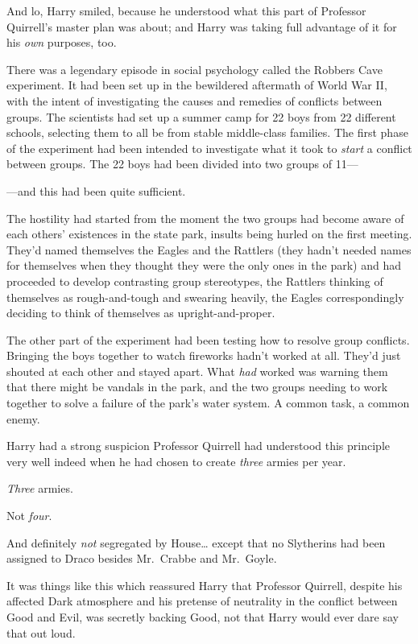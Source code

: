 And lo, Harry smiled, because he understood what this part of Professor
Quirrell's master plan was about; and Harry was taking full advantage of
it for his \emph{own} purposes, too.

There was a legendary episode in social psychology called the Robbers
Cave experiment. It had been set up in the bewildered aftermath of World
War II, with the intent of investigating the causes and remedies of
conflicts between groups. The scientists had set up a summer camp for 22
boys from 22 different schools, selecting them to all be from stable
middle-class families. The first phase of the experiment had been
intended to investigate what it took to \emph{start} a conflict between
groups. The 22 boys had been divided into two groups of 11---

---and this had been quite sufficient.

The hostility had started from the moment the two groups had become
aware of each others' existences in the state park, insults being hurled
on the first meeting. They'd named themselves the Eagles and the
Rattlers (they hadn't needed names for themselves when they thought they
were the only ones in the park) and had proceeded to develop contrasting
group stereotypes, the Rattlers thinking of themselves as
rough-and-tough and swearing heavily, the Eagles correspondingly
deciding to think of themselves as upright-and-proper.

The other part of the experiment had been testing how to resolve group
conflicts. Bringing the boys together to watch fireworks hadn't worked
at all. They'd just shouted at each other and stayed apart. What
\emph{had} worked was warning them that there might be vandals in the
park, and the two groups needing to work together to solve a failure of
the park's water system. A common task, a common enemy.

Harry had a strong suspicion Professor Quirrell had understood this
principle very well indeed when he had chosen to create \emph{three}
armies per year.

\emph{Three} armies.

Not \emph{four}.

And definitely \emph{not} segregated by House\ldots{} except that no
Slytherins had been assigned to Draco besides Mr.~Crabbe and Mr.~Goyle.

It was things like this which reassured Harry that Professor Quirrell,
despite his affected Dark atmosphere and his pretense of neutrality in
the conflict between Good and Evil, was secretly backing Good, not that
Harry would ever dare say that out loud.

